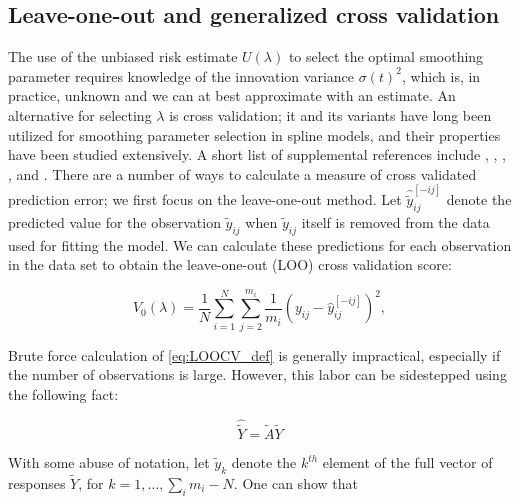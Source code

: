 \documentclass[12pt]{article}
\newcommand{\tildeY}{\tilde{Y}}
\newcommand{\tildey}{\tilde{y}}
\newcommand{\tildeA}{\tilde{A}}
\theoremstyle{definition}
\begin{document}
\subsection{Leave-one-out and generalized cross validation}
The use of the unbiased risk estimate $U\left( \lambda \right)$ to select the optimal smoothing parameter requires knowledge of the innovation variance $\sigma\left(t \right)^2$, which is, in practice, unknown and we can at best approximate with an estimate. An alternative for selecting $\lambda$ is cross validation; it and its variants have long been utilized for smoothing parameter selection in spline models, and their properties have been studied extensively. A short list of supplemental references include \citet{craven1978smoothing}, \citet{wahba1985comparison}, \citet{hardle1988far}, \citet{hardle1992applied}, and \citet{wahba1990spline}. There are a number of ways to calculate a measure of cross validated prediction error; we first focus on the leave-one-out method. Let $\hat{\tildey}^{\left[-ij\right]}_{ij}$ denote the predicted value for the observation $\tildey_{ij}$ when $\tildey_{ij}$ itself is removed from the data used for fitting the model. We can calculate these predictions for each observation in the data set to obtain the leave-one-out (LOO) cross validation score:

\begin{equation} \label{eq:LOOCV}
V_0\left(\lambda\right) = \frac{1}{N} \sum_{i=1}^N \sum_{j=2}^{m_i} \frac{1}{m_i} \left(  y_{ij} - \hat{y}^{\left[-ij\right]}_{ij}\right)^2, 
\end{equation}

Brute force calculation of \ref{eq:LOOCV_def} is generally impractical, especially if the number of observations is large. However, this labor can be sidestepped using the following fact: 

\begin{equation*}
\widehat{\tildeY} = \tildeA \tildeY
\end{equation*}
\noindent

With some abuse of notation, let $\tildey_{k}$ denote the $k^{th}$ element of the full vector of responses $\tildeY$, for $k = 1, \dots, \sum_i m_i - N$. One can show that 
\end{document}
